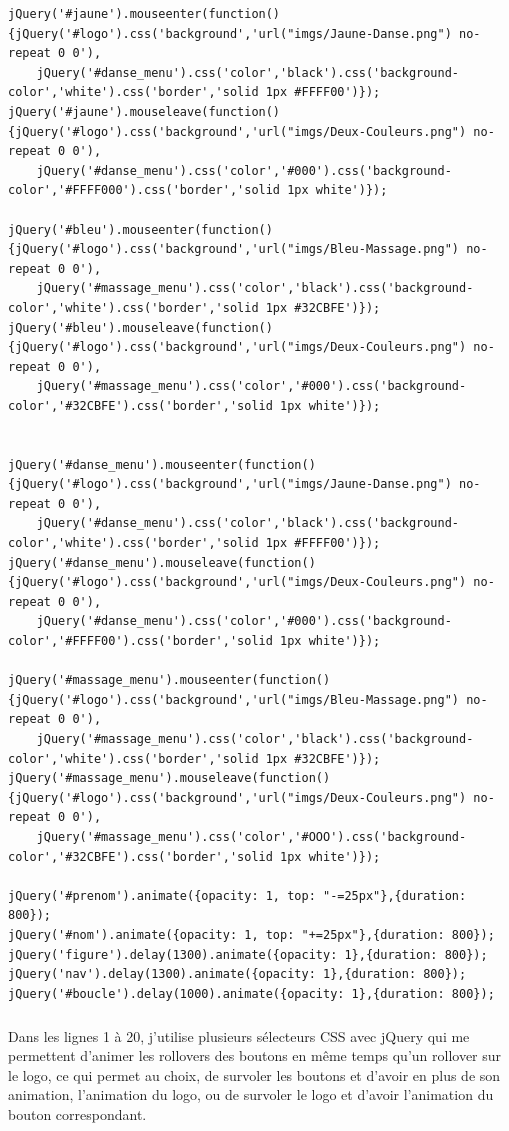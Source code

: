 \documentclass[11pt,a4paper,twoside]{report}
\begin{document}
					\begin{lstlisting}
jQuery('#jaune').mouseenter(function() {jQuery('#logo').css('background','url("imgs/Jaune-Danse.png") no-repeat 0 0'),
	jQuery('#danse_menu').css('color','black').css('background-color','white').css('border','solid 1px #FFFF00')});
jQuery('#jaune').mouseleave(function() {jQuery('#logo').css('background','url("imgs/Deux-Couleurs.png") no-repeat 0 0'),
	jQuery('#danse_menu').css('color','#000').css('background-color','#FFFF000').css('border','solid 1px white')});

jQuery('#bleu').mouseenter(function() {jQuery('#logo').css('background','url("imgs/Bleu-Massage.png") no-repeat 0 0'),
	jQuery('#massage_menu').css('color','black').css('background-color','white').css('border','solid 1px #32CBFE')});
jQuery('#bleu').mouseleave(function() {jQuery('#logo').css('background','url("imgs/Deux-Couleurs.png") no-repeat 0 0'),
	jQuery('#massage_menu').css('color','#000').css('background-color','#32CBFE').css('border','solid 1px white')});


jQuery('#danse_menu').mouseenter(function() {jQuery('#logo').css('background','url("imgs/Jaune-Danse.png") no-repeat 0 0'),
	jQuery('#danse_menu').css('color','black').css('background-color','white').css('border','solid 1px #FFFF00')});
jQuery('#danse_menu').mouseleave(function() {jQuery('#logo').css('background','url("imgs/Deux-Couleurs.png") no-repeat 0 0'),
	jQuery('#danse_menu').css('color','#000').css('background-color','#FFFF00').css('border','solid 1px white')});

jQuery('#massage_menu').mouseenter(function() {jQuery('#logo').css('background','url("imgs/Bleu-Massage.png") no-repeat 0 0'),
	jQuery('#massage_menu').css('color','black').css('background-color','white').css('border','solid 1px #32CBFE')});
jQuery('#massage_menu').mouseleave(function() {jQuery('#logo').css('background','url("imgs/Deux-Couleurs.png") no-repeat 0 0'),
	jQuery('#massage_menu').css('color','#OOO').css('background-color','#32CBFE').css('border','solid 1px white')});

jQuery('#prenom').animate({opacity: 1, top: "-=25px"},{duration: 800});
jQuery('#nom').animate({opacity: 1, top: "+=25px"},{duration: 800});
jQuery('figure').delay(1300).animate({opacity: 1},{duration: 800});
jQuery('nav').delay(1300).animate({opacity: 1},{duration: 800});
jQuery('#boucle').delay(1000).animate({opacity: 1},{duration: 800});
					\end{lstlisting}	
				\subparagraph*{}Dans les lignes 1 à 20, j'utilise plusieurs sélecteurs CSS avec jQuery qui me permettent d'animer les rollovers des boutons en même temps qu'un rollover sur le logo, ce qui permet au choix, de survoler les boutons et d'avoir en plus de son animation, l'animation du logo, ou de survoler le logo et d'avoir l'animation du bouton correspondant.\\
\end{document}
